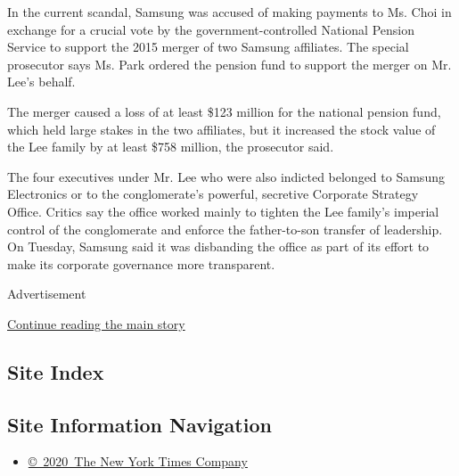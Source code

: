 In the current scandal, Samsung was accused of making payments to Ms.
Choi in exchange for a crucial vote by the government-controlled
National Pension Service to support the 2015 merger of two Samsung
affiliates. The special prosecutor says Ms. Park ordered the pension
fund to support the merger on Mr. Lee's behalf.

The merger caused a loss of at least \$123 million for the national
pension fund, which held large stakes in the two affiliates, but it
increased the stock value of the Lee family by at least \$758 million,
the prosecutor said.

The four executives under Mr. Lee who were also indicted belonged to
Samsung Electronics or to the conglomerate's powerful, secretive
Corporate Strategy Office. Critics say the office worked mainly to
tighten the Lee family's imperial control of the conglomerate and
enforce the father-to-son transfer of leadership. On Tuesday, Samsung
said it was disbanding the office as part of its effort to make its
corporate governance more transparent.

Advertisement

\protect\hyperlink{after-bottom}{Continue reading the main story}

\hypertarget{site-index}{%
\subsection{Site Index}\label{site-index}}

\hypertarget{site-information-navigation}{%
\subsection{Site Information
Navigation}\label{site-information-navigation}}

\begin{itemize}
\tightlist
\item
  \href{https://help.nytimes3xbfgragh.onion/hc/en-us/articles/115014792127-Copyright-notice}{©~2020~The
  New York Times Company}
\end{itemize}


